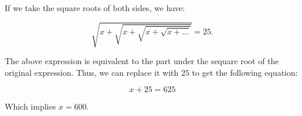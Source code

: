 \begin{solution}
If we take the square roots of both sides, we have:

$$
\sqrt{x + \sqrt{x + \sqrt{x + \sqrt{x + ...}}}} = 25.
$$

The above expression is equivalent to the part under the sequare root  of the original expression. Thus, we can replace it with $25$ to get the following equation:

$$
x + 25 = 625
$$

Which implies $x = 600$.
\end{solution}